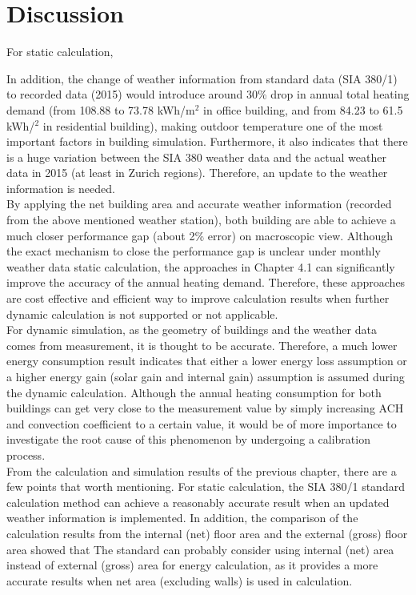 \documentclass[a4paper, oneside]{discothesis}
\begin{document}
\chapter{Discussion}
    
	
	For static calculation, 

	In addition, the change of weather information from standard data (SIA 380/1) to recorded data (2015) would introduce around 30\% drop in annual total heating demand (from 108.88 to 73.78 kWh/m$^2$ in office building, and from 84.23 to 61.5 kWh/$^2$ in residential building), making outdoor temperature one of the most important factors in building simulation. Furthermore, it also indicates that there is a huge variation between the SIA 380 weather data and the actual weather data in 2015 (at least in Zurich regions). Therefore, an update to the weather information is needed.\\

	By applying the net building area and accurate weather information (recorded from the above mentioned weather station), both building are able to achieve a much closer performance gap (about 2\% error) on macroscopic view. Although the exact mechanism to close the performance gap is unclear under monthly weather data static calculation, the approaches in Chapter 4.1 can significantly improve the accuracy of the annual heating demand. Therefore, these approaches are cost effective and efficient way to improve calculation results when further dynamic calculation is not supported or not applicable.\\

	For dynamic simulation, as the geometry of buildings and the weather data comes from measurement, it is thought to be accurate. Therefore, a much lower energy consumption result indicates that either a lower energy loss assumption or a higher energy gain (solar gain and internal gain) assumption is assumed during the dynamic calculation. Although the annual heating consumption for both buildings can get very close to the measurement value by simply increasing ACH and convection coefficient to a certain value, it would be of more importance to investigate the root cause of this phenomenon by undergoing a calibration process.\\

    From the calculation and simulation results of the previous chapter, there are a few points that worth mentioning. For static calculation, the SIA 380/1 standard calculation method can achieve a reasonably accurate result when an updated weather information is implemented. In addition, the comparison of the calculation results from the internal (net) floor area and the external (gross) floor area showed that
    The standard can probably consider using internal (net) area instead of external (gross) area for energy calculation, as it provides a more accurate results when net area (excluding walls) is used in calculation.\\
    
\end{document}

